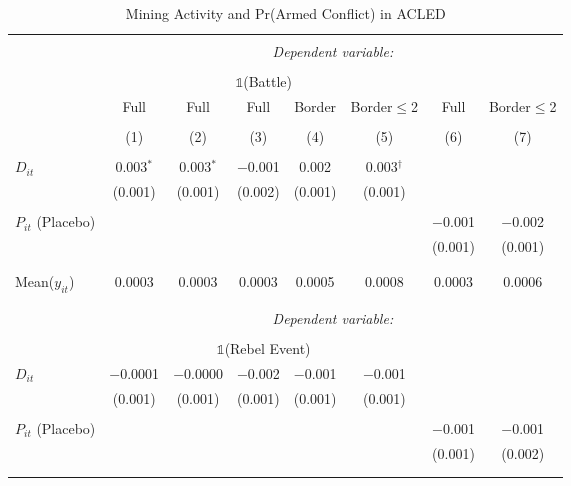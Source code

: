 \begin{table}[ht!] \centering
  \caption{Mining Activity and Pr(Armed Conflict) in ACLED} 
  \label{tab:did_acled_armedconf}
\begin{tabular}{@{\extracolsep{0pt}}lccccccc}
\\[-1.8ex]\hline
\hline \\[-1.8ex]
 & \multicolumn{7}{c}{\textit{Dependent variable:}} \\
\cline{2-8}
\\[-1.8ex] & \multicolumn{5}{c}{$\mathbb{1}$(Battle)} & \multicolumn{2}{c}{} \\
 & Full & Full & Full & Border & Border$\leq$2 & Full & Border$\leq$2 \\
\\[-1.8ex] & (1) & (2) & (3) & (4) & (5) & (6) & (7)\\
\hline \\[-1.8ex]
 $D_{it}$ & 0.003$^{*}$ & 0.003$^{*}$ & $-$0.001 & 0.002 & 0.003$^{\dagger}$ &  &  \\
  & (0.001) & (0.001) & (0.002) & (0.001) & (0.001) &  &  \\
  & & & & & & & \\
 $P_{it}$ (Placebo) &  &  &  &  &  & $-$0.001 & $-$0.002 \\
  &  &  &  &  &  & (0.001) & (0.001) \\
  & & & & & & & \\
\hline \\[-1.8ex]
Mean($y_{it}$) & 0.0003 & 0.0003 & 0.0003 & 0.0005 & 0.0008 & 0.0003 & 0.0006 \\
\\[-1.8ex]\hline \hline \\[-1.8ex]
 & \multicolumn{7}{c}{\textit{Dependent variable:}} \\
\cline{2-8}
\\[-1.8ex] & \multicolumn{5}{c}{$\mathbb{1}$(Rebel Event)} & \multicolumn{2}{c}{} \\
 $D_{it}$ & $-$0.0001 & $-$0.0000 & $-$0.002 & $-$0.001 & $-$0.001 &  &  \\
  & (0.001) & (0.001) & (0.001) & (0.001) & (0.001) &  &  \\
  & & & & & & & \\
 $P_{it}$ (Placebo) &  &  &  &  &  & $-$0.001 & $-$0.001 \\
  &  &  &  &  &  & (0.001) & (0.002) \\
  & & & & & & & \\
\hline \\[-1.8ex]

\end{tabular}
\end{table}
